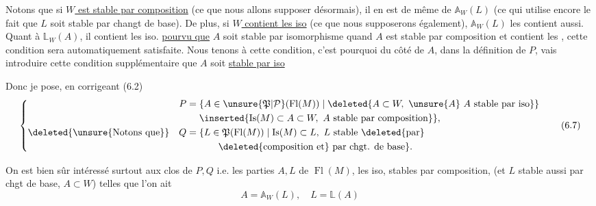  Notons que si \uline{$W$ est stable par composition} (ce que
nous allons supposer désormais), il en est de même
de $\mathbb A_W(L)$ (ce qui utilise  encore
le fait que $L$ soit stable par changt de base).
De plus, si \uline{$W$ contient les iso} (ce que nous
supposerons également), $\mathbb A_W(L)$ les contient aussi.
Quant à $\mathbb L_W(A)$, il contient les iso.
\uline{pourvu que} $A$ soit stable par isomorphisme\unsure{;}
quand $A$ est stable par composition et contient les
, cette condition sera automatiquement satisfaite. Nous tenons à cette condition, c'est
pourquoi du côté de $A$, dans la définition
de $P$,  vais introduire cette condition
supplémentaire que $A$ soit \uline{stable par iso}

Donc je pose, en corrigeant (6.2)
\[
\left\{\begin{aligned}
P={}&\{A\in\unsure{\mathfrak{P}|\mathcal{P}}(\operatorname{Fl}(M))\mid
\deleted{A\subset W,\ \unsure{A}\ A\ \text{stable par iso}\}}\\
&\inserted{\operatorname{Is}(M)\subset A\subset W,\ A\ \text{stable par composition}}\},\\
\deleted{\text{\unsure{Notons que}}}\quad
Q={}&\{L\in\mathfrak{P}(\operatorname{Fl}(M))\mid\operatorname{Is}(M)\subset L,\ L\ \text{stable }\deleted{\text{par}}\\
&\qquad\deleted{\text{composition et}}\ \text{par chgt. de base}\}.
\end{aligned}\right.\tag*{(6.7)}
\]

On est bien sûr intéressé surtout aux
 clos de $P,Q$ i.e. les parties
$A,L$ de $\operatorname{Fl}(M)$,  les iso, stables
par composition, (et $L$ stable aussi par chgt
de base, $A\subset W$) telles que l'on ait
\[
A=\mathbb A_W(L),\quad L=\mathbb L(A)\tag*{(6.8)}
\]
